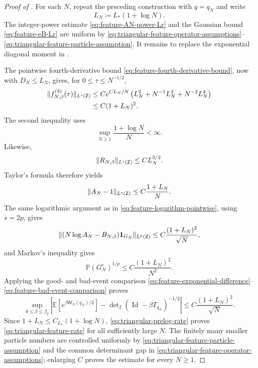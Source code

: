 \documentclass[11pt,reqno]{amsart}
\numberwithin{equation}{section}
\theoremstyle{plain}
\theoremstyle{definition}
\DeclarePairedDelimiter{\norm}{\lVert}{\rVert}
\newcommand{\E}{\mathbb E}
\newcommand{\Pb}{\mathbb P}
\newcommand{\Id}{\operatorname{Id}}
\newcommand{\one}{\mathbf 1}
\newcommand{\be}{\beta}
\begin{document}
\begin{proof}[Proof of ]
For each $N$, repeat the preceding construction with $q=q_N$ and write
\begin{equation}
 L_N\coloneqq L_*(1+\log N).
 \label{eq:triangular-LN}
\end{equation}
The integer-power estimate \eqref{eq:feature-AN-power-Lr} and the Gaussian bound \eqref{eq:feature-eB-Lr} are uniform by \eqref{eq:triangular-feature-operator-assumptions}--\eqref{eq:triangular-feature-particle-assumption}.  It remains to replace the exponential diagonal moment in .

The pointwise fourth-derivative bound \eqref{eq:feature-fourth-derivative-bound}, now with $D_N\leq L_N$, gives, for $0\leq\tau\leq N^{-1/2}$,
\begin{align}
 \norm{f_{N,\be}^{(4)}(\tau)}_{L^s(\mathsf Z)}
 &\leq C
 e^{C L_N/N}
 \left(L_N^2+N^{-1}L_N^3+N^{-2}L_N^4\right)
 \notag\\
 &\leq C(1+L_N)^2.
 \label{eq:triangular-fourth-derivative}
\end{align}
The second inequality uses
\begin{equation}
 \sup_{N\geq1}\frac{1+\log N}{N}<\infty.
 \label{eq:triangular-log-over-N}
\end{equation}
Likewise,
\begin{equation}
 \norm{R_{N,\be}}_{L^s(\mathsf Z)}
 \leq C L_N^{3/2}.
 \label{eq:triangular-third-chaos}
\end{equation}
Taylor's formula therefore yields
\begin{equation}
 \norm{A_N-1}_{L^s(\mathsf Z)}
 \leq C\frac{1+L_N}{N}.
 \label{eq:triangular-AN-minus-one}
\end{equation}
The same logarithmic argument as in \eqref{eq:feature-logarithm-pointwise}, using $s=2p$, gives
\begin{equation}
 \norm{(N\log A_N-B_{N,\be})\one_{G_N}}_{L^p(\mathsf Z)}
 \leq C\frac{(1+L_N)^2}{\sqrt N},
 \label{eq:triangular-logarithmic-error}
\end{equation}
and Markov's inequality gives
\begin{equation}
 \Pb(G_N^c)^{1/p}
 \leq C\frac{(1+L_N)^2}{N^2}.
 \label{eq:triangular-bad-event}
\end{equation}
Applying the good- and bad-event comparison \eqref{eq:feature-exponential-difference}--\eqref{eq:feature-bad-event-comparison} proves
\begin{equation}
 \sup_{0\leq\be\leq\be_0}
 \left|\E\left[e^{\be\mathsf W_N(q_N)/2}\right]
 -\det\nolimits_2(\Id-\be T_{q_N})^{-1/2}\right|
 \leq C\frac{(1+L_N)^2}{\sqrt N}.
 \label{eq:triangular-prelog-rate}
\end{equation}
Since $1+L_N\leq C_{L_*}(1+\log N)$, \eqref{eq:triangular-prelog-rate} proves \eqref{eq:triangular-feature-rate} for all sufficiently large $N$.  The finitely many smaller particle numbers are controlled uniformly by \eqref{eq:triangular-feature-particle-assumption} and the common determinant gap in \eqref{eq:triangular-feature-operator-assumptions}; enlarging $C$ proves the estimate for every $N\geq1$.
\end{proof}
\end{document}
